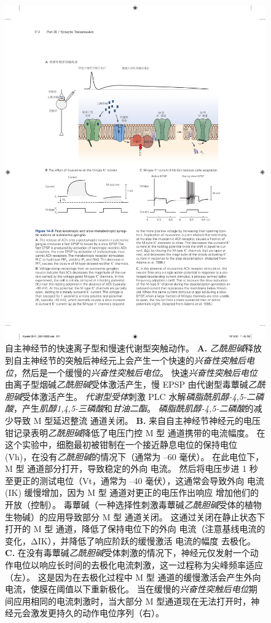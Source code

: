 \begin{figure}[htbp]
	\centering
	\includegraphics[width=0.8\linewidth]{chap14/fig_14_8}
	\caption{自主神经节的快速离子型和慢速代谢型突触动作。
		\textbf{A.} \textit{乙酰胆碱}释放到自主神经节的突触后神经元上会产生一个快速的\textit{兴奋性突触后电位}，然后是一个缓慢的\textit{兴奋性突触后电位}。
		快速\textit{兴奋性突触后电位}由离子型烟碱\textit{乙酰胆碱}受体激活产生，慢 EPSP 由代谢型毒蕈碱\textit{乙酰胆碱}受体激活产生。
		\textit{代谢型受体}刺激 PLC 水解\textit{磷脂酰肌醇-4,5-二磷酸}，产生\textit{肌醇1,4,5-三磷酸}和\textit{甘油二酯}。
		\textit{磷脂酰肌醇-4,5-二磷酸}的减少导致 M 型延迟整流  通道关闭。
		\textbf{B.} 来自自主神经节神经元的电压钳记录表明\textit{乙酰胆碱}降低了电压门控 M 型  通道携带的电流幅度。
		在这个实验中，细胞最初被钳制在一个接近静息电位的保持电位 (Vh)，在没有\textit{乙酰胆碱}的情况下（通常为 –60 毫伏）。
		在此电位下，M 型  通道部分打开，导致稳定的外向  电流。
		然后将电压步进 1 秒至更正的测试电位（Vt，通常为 –40 毫伏），这通常会导致外向  电流 (IK) 缓慢增加，因为 M 型  通道对更正的电压作出响应 增加他们的开放（控制）。
		毒蕈碱（一种选择性刺激毒蕈碱\textit{乙酰胆碱}受体的植物生物碱）的应用导致部分 M 型  通道关闭。
		这通过关闭在静止状态下打开的 M 型  通道，降低了保持电位下的外向  电流（注意基线电流的变化，ΔIK），并降低了响应阶跃的缓慢激活  电流的幅度 去极化\cite{adams1986slow}。
		\textbf{C.} 在没有毒蕈碱\textit{乙酰胆碱}受体刺激的情况下，神经元仅发射一个动作电位以响应长时间的去极化电流刺激，这一过程称为尖峰频率适应（左）。
		这是因为在去极化过程中 M 型  通道的缓慢激活会产生外向电流，使膜在阈值以下重新极化。
		当在缓慢的\textit{兴奋性突触后电位}期间应用相同的电流刺激时，当大部分 M 型通道现在无法打开时，神经元会激发更持久的动作电位序列（右）\cite{adams1986slow}。}
	\label{fig:14_8}
\end{figure}


